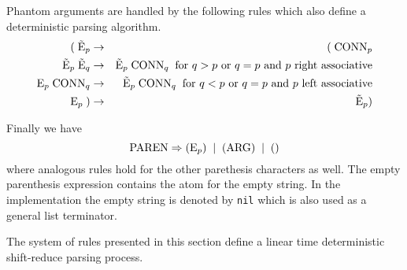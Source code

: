 \documentclass{article}
\begin{document}
Phantom arguments are handled by the following rules which also define a deterministic parsing algorithm.
\begin{eqnarray*}
   (\;\tilde{\mathrm{E}}_p  & \rightarrow &   (\; \mathrm{CONN}_p \\
  \tilde{\mathrm{E}}_p \;\tilde{\mathrm{E}}_q & \rightarrow & \tilde{\mathrm{E}}_p  \;\mathrm{CONN}_q\;\;\mbox{for $q > p$ or $q= p$ and $p$ right associative} \\
  \mathrm{E}_p \;\mathrm{CONN}_q & \rightarrow & \tilde{\mathrm{E}}_p \;\mathrm{CONN}_q \;\;\mbox{for $q < p$ or $q= p$ and $p$ left associative} \\
    \mathrm{E}_p\;) &\rightarrow & \tilde{\mathrm{E}}_p)
\end{eqnarray*}

Finally we have
$$\mathrm{PAREN} \Rightarrow (\mathrm{E}_p) \;\;|\;\; (\mathrm{ARG})\;\;| \;\;()$$
where analogous rules hold for the other parethesis characters as well.  The empty parenthesis expression contains the atom for the empty string.
In the implementation the empty string is denoted by {\tt nil} which is also used as a general list terminator.

The system of rules presented in this section define a linear time deterministic shift-reduce parsing process.
\end{document}
